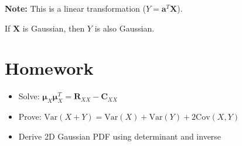 \documentclass[11pt]{article}
\begin{document}
\textbf{Note:} This is a linear transformation ($Y = \mathbf{a}^T \mathbf{X}$).

If $\mathbf{X}$ is Gaussian, then $Y$ is also Gaussian.

\section{Homework}

\begin{itemize}
    \item Solve: $\boldsymbol{\mu}_X \boldsymbol{\mu}_X^T = \mathbf{R}_{XX} - \mathbf{C}_{XX}$
    \item Prove: $\mathrm{Var}(X+Y) = \mathrm{Var}(X) + \mathrm{Var}(Y) + 2\mathrm{Cov}(X,Y)$
    \item Derive 2D Gaussian PDF using determinant and inverse
\end{itemize}
\end{document}
